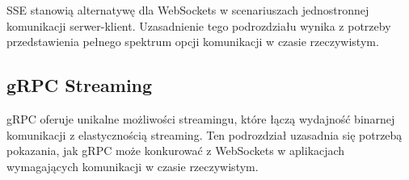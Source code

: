 SSE stanowią alternatywę dla WebSockets w scenariuszach jednostronnej komunikacji serwer-klient. Uzasadnienie tego podrozdziału wynika z potrzeby przedstawienia pełnego spektrum opcji komunikacji w czasie rzeczywistym.

\subsection{gRPC Streaming}
\label{subsec:gRPCStreaming}

gRPC oferuje unikalne możliwości streamingu, które łączą wydajność binarnej komunikacji z elastycznością streaming. Ten podrozdział uzasadnia się potrzebą pokazania, jak gRPC może konkurować z WebSockets w aplikacjach wymagających komunikacji w czasie rzeczywistym.
